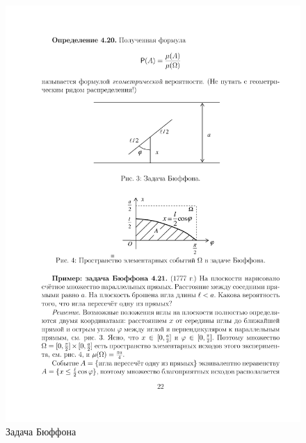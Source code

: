\begin{figure}[h!]
	\centering
	\includegraphics[]{pic/pic3}
	\caption{Задача Бюффона}
	\label{fig3}
\end{figure}

